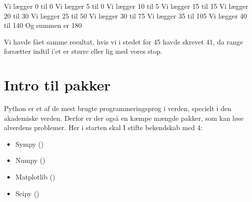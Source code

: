 \documentclass[letterpaper,10pt,english]{jupyterBook}
\begin{document}
\begin{sphinxVerbatim}[commandchars=\\\{\}]
  
      
      
    
\end{sphinxVerbatim}

\begin{sphinxVerbatim}[commandchars=\\\{\}]
Vi lægger 0 til 0
Vi lægger 5 til 0
Vi lægger 10 til 5
Vi lægger 15 til 15
Vi lægger 20 til 30
Vi lægger 25 til 50
Vi lægger 30 til 75
Vi lægger 35 til 105
Vi lægger 40 til 140
Og summen er 180
\end{sphinxVerbatim}

Vi havde fået samme resultat, hvis vi i stedet for 45 havde skrevet 41, da range forsætter indtil i’et er større eller lig med vores stop.


\chapter{Intro til pakker}
\label{\detokenize{notebooks/Intro_til_pakker:intro-til-pakker}}\label{\detokenize{notebooks/Intro_til_pakker::doc}}
Python er et af de mest brugte programmeringsprog i verden, specielt i den akademiske verden. Derfor er der også en kæmpe mængde pakker, som kan løse alverdens problemer. Her i starten skal I stifte bekendskab med 4:
\begin{itemize}
\item {} 
Sympy ()

\item {} 
Numpy ()

\item {} 
Matplotlib ()

\item {} 
Scipy ()

\end{itemize}
\end{document}
